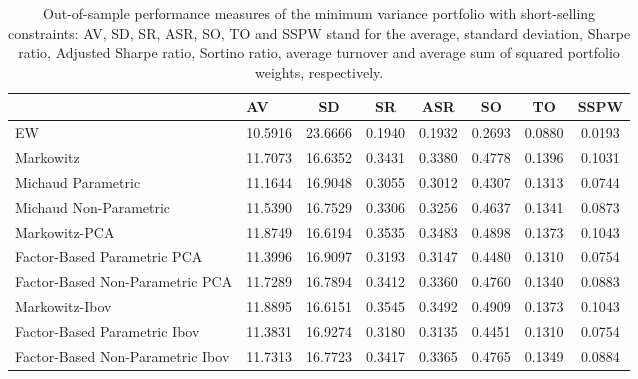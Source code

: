 \begin{table}

\caption{\label{tab:empirical_mvp}Out-of-sample performance measures of the minimum variance portfolio with short-selling constraints: AV, SD, SR, ASR, SO, TO and SSPW stand for the average, standard deviation, Sharpe ratio, Adjusted Sharpe ratio, Sortino ratio, average turnover and average sum of squared portfolio weights, respectively.}
\centering
\begin{tabular}[t]{l|l|c|c|c|c|c|c}
\hline
  & AV & SD & SR & ASR & SO & TO & SSPW\\
\hline
EW & 10.5916 & 23.6666 & 0.1940 & 0.1932 & 0.2693 & 0.0880 & 0.0193\\
\hline
Markowitz & 11.7073 & 16.6352 & 0.3431 & 0.3380 & 0.4778 & 0.1396 & 0.1031\\
\hline
Michaud Parametric & 11.1644 & 16.9048 & 0.3055 & 0.3012 & 0.4307 & 0.1313 & 0.0744\\
\hline
Michaud Non-Parametric & 11.5390 & 16.7529 & 0.3306 & 0.3256 & 0.4637 & 0.1341 & 0.0873\\
\hline
Markowitz-PCA & 11.8749 & 16.6194 & 0.3535 & 0.3483 & 0.4898 & 0.1373 & 0.1043\\
\hline
Factor-Based Parametric PCA & 11.3996 & 16.9097 & 0.3193 & 0.3147 & 0.4480 & 0.1310 & 0.0754\\
\hline
Factor-Based Non-Parametric PCA & 11.7289 & 16.7894 & 0.3412 & 0.3360 & 0.4760 & 0.1340 & 0.0883\\
\hline
Markowitz-Ibov & 11.8895 & 16.6151 & 0.3545 & 0.3492 & 0.4909 & 0.1373 & 0.1043\\
\hline
Factor-Based Parametric Ibov & 11.3831 & 16.9274 & 0.3180 & 0.3135 & 0.4451 & 0.1310 & 0.0754\\
\hline
Factor-Based Non-Parametric Ibov & 11.7313 & 16.7723 & 0.3417 & 0.3365 & 0.4765 & 0.1349 & 0.0884\\
\hline
\end{tabular}
\end{table}
